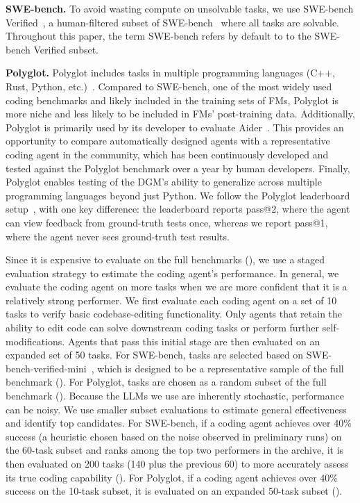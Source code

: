 \documentclass{article} %
\begin{document}
\textbf{SWE-bench.} To avoid wasting compute on unsolvable tasks, we use SWE-bench Verified~\citep{openai2024sweverified}, a human-filtered subset of SWE-bench~\citep{jimenez2024swebench} where all tasks are solvable. Throughout this paper, the term SWE-bench refers by default to to the SWE-bench Verified subset.

\textbf{Polyglot.} Polyglot includes tasks in multiple programming languages (C++, Rust, Python, etc.)~\citep{gauthier2024polyglot}. Compared to SWE-bench, one of the most widely used coding benchmarks and likely included in the training sets of FMs, Polyglot is more niche and less likely to be included in FMs' post-training data. Additionally, Polyglot is primarily used by its developer to evaluate Aider~\citep{aider2024}. This provides an opportunity to compare automatically designed agents with a representative coding agent in the community, which has been continuously developed and tested against the Polyglot benchmark over a year by human developers. Finally, Polyglot enables testing of the DGM's ability to generalize across multiple programming languages beyond just Python. We follow the Polyglot leaderboard setup~\citep{gauthier2024polyglot}, with one key difference: the leaderboard reports pass@2, where the agent can view feedback from ground-truth tests once, whereas we report pass@1, where the agent never sees ground-truth test results.

Since it is expensive to evaluate on the full benchmarks (), we use a staged evaluation strategy to estimate the coding agent's performance. In general, we evaluate the coding agent on more tasks when we are more confident that it is a relatively strong performer. We first evaluate each coding agent on a set of 10 tasks to verify basic codebase-editing functionality. Only agents that retain the ability to edit code can solve downstream coding tasks or perform further self-modifications. Agents that pass this initial stage are then evaluated on an expanded set of 50 tasks. For SWE-bench, tasks are selected based on SWE-bench-verified-mini~\citep{hobbhahn2025swebenchmini}, which is designed to be a representative sample of the full benchmark (). For Polyglot, tasks are chosen as a random subset of the full benchmark (). Because the LLMs we use are inherently stochastic, performance can be noisy. We use smaller subset evaluations to estimate general effectiveness and identify top candidates. For SWE-bench, if a coding agent achieves over 40\% success (a heuristic chosen based on the noise observed in preliminary runs) on the 60-task subset and ranks among the top two performers in the archive, it is then evaluated on 200 tasks (140 plus the previous 60) to more accurately assess its true coding capability (). For Polyglot, if a coding agent achieves over 40\% success on the 10-task subset, it is evaluated on an expanded 50-task subset ().
\end{document}
